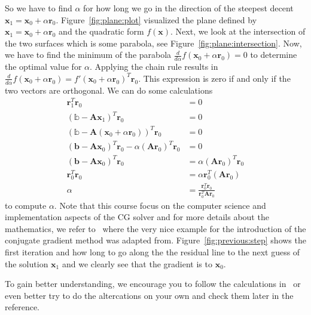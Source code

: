 \documentclass[11pt,fleqn]{book} %
\begin{document}
So we have to find $\alpha$ for how long we go in the direction of the steepest decent $\mathbf{x}_1 = \mathbf{x}_0 + \alpha \mathbf{r}_0$. Figure~\ref{fig:plane:plot} visualized the plane defined by $\mathbf{x}_1 = \mathbf{x}_0 + \alpha \mathbf{r}_0$ and the quadratic form $f(\mathbf{x})$. Next, we look at the intersection of the two surfaces which is some parabola, see Figure~\ref{fig:plane:intersection}. Now, we have to find the minimum of the parabola $\frac{d}{d\alpha} f(\mathbf{x}_0 + \alpha \mathbf{r}_0) = 0$ to determine the optimal value for $\alpha$. Applying the chain rule results in $\frac{d}{d\alpha} f(\mathbf{x}_0 + \alpha \mathbf{r}_0)= f'(\mathbf{x}_0 + \alpha \mathbf{r}_0)^T \mathbf{r}_0$. This expression is zero if and only if the two vectors are orthogonal. We can do some calculations
\begin{align}
\mathbf{r}^T_1 \mathbf{r}_0 &= 0 \\
(\mathbb{b}-\mathbf{A} \mathbf{x}_1)^T \mathbf{r}_0 & = 0 \\
(\mathbb{b}-\mathbf{A} (\mathbf{x}_0 + \alpha \mathbf{r}_0))^T \mathbf{r}_0 & = 0 \\
(\mathbf{b}- \mathbf{A} \mathbf{x}_0)^T \mathbf{r}_0 - \alpha(\mathbf{A}\mathbf{r}_0)^T \mathbf{r}_0 &= 0 \\
(\mathbf{b}- \mathbf{A} \mathbf{x}_0)^T \mathbf{r}_0  &= \alpha(\mathbf{A}\mathbf{r}_0)^T \mathbf{r}_0 \\
\mathbf{r}^T_0 \mathbf{r}_0 &= \alpha \mathbf{r}^T_0 (\mathbf{A}\mathbf{r}_0) \\
\alpha &= \frac{\mathbf{r}^T_0 \mathbf{r}_0}{\mathbf{r}^T_0 \mathbf{A}\mathbf{r}_0}
\end{align}
to compute $\alpha$. Note that this course focus on the computer science and implementation aspects of the CG solver and for more details about the mathematics, we refer to~\cite{shewchuk1994introduction} where the very nice example for the introduction of the conjugate gradient method was adapted from. Figure~\ref{fig:previous:step} shows the first iteration and how long to go along the the residual line to the next guess of the solution $\mathbf{x}_1$ and we clearly see that the gradient is to $\mathbf{x}_0$.\\

\begin{exercise}
To gain better understanding, we encourage you to follow the calculations in~\cite{shewchuk1994introduction} or even better try to do the altercations on your own and check them later in the reference.
\end{exercise}
\end{document}
